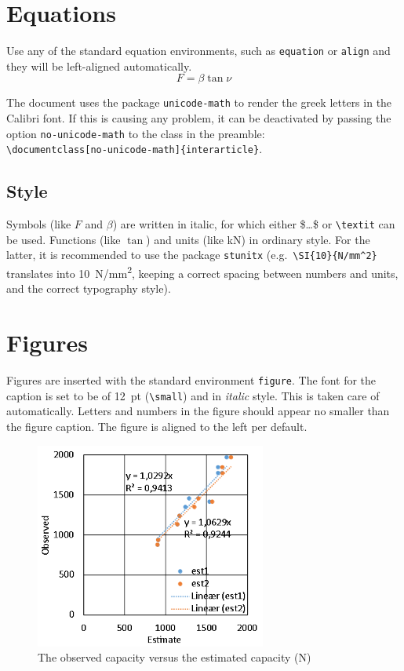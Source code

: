 \documentclass[unicode-math]{interarticle}
\newcommand\comm[1]{\texttt{\textbackslash #1}}
\begin{document}
\section{Equations}
Use any of the standard equation environments, such as \texttt{equation} or \texttt{align} and they will be left-aligned automatically.
%
\begin{equation}
  F=\beta \tan \nu
  \label{eq:eq1}
\end{equation}

The document uses the package \texttt{unicode-math} to render the greek letters in the Calibri font.
If this is causing any problem, it can be deactivated by passing the option \texttt{no-unicode-math} to the class in the preamble: \\
\comm{documentclass[no-unicode-math]\{interarticle\}}.

\subsection{Style}
Symbols (like $F$ and $\beta$) are written in italic, for which either \$\ldots\$ or \comm{textit} can be used.
Functions (like $\tan$) and units (like \si{kN}) in ordinary style.
For the latter, it is recommended to use the package \texttt{stunitx} (e.g.\ \comm{SI\{10\}\{N/mm\^{}2\}} translates into \SI{10}{N/mm^2}, keeping a correct spacing between numbers and units, and the correct typography style).

\section{Figures}
Figures are inserted with the standard environment \texttt{figure}.
The font for the caption is set to be of \SI{12}{pt} (\comm{small}) and in \textit{italic} style.
This is taken care of automatically.
Letters and numbers in the figure should appear no smaller than the figure caption.
The figure is aligned to the left per default.\par

\begin{figure}[htb]
  \includegraphics[width=7.6cm]{./img/figure1.png}
  \caption{The observed capacity versus the estimated capacity (\si{N})}%
  \label{fig:figure1}%
\end{figure}
\end{document}
